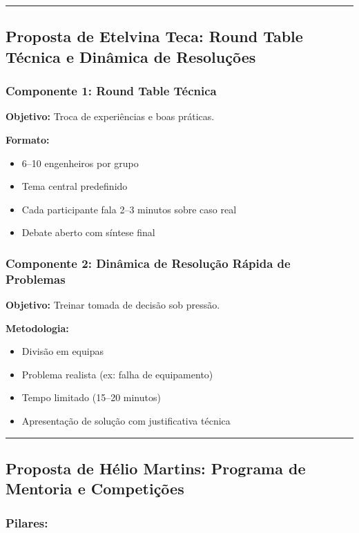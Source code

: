 \documentclass[12pt,a4paper]{article}
\begin{document}
\textcolor{spe-secondary}{\hspace{0.5cm}\rule{0.4\linewidth}{0.8pt}}
\subsection{Proposta de Etelvina Teca: Round Table Técnica e Dinâmica de Resoluções}

\subsubsection*{Componente 1: Round Table Técnica}

\textbf{Objetivo:} Troca de experiências e boas práticas.

\textbf{Formato:}
\begin{itemize}[itemsep=0.15cm]
    \item 6--10 engenheiros por grupo
    \item Tema central predefinido
    \item Cada participante fala 2--3 minutos sobre caso real
    \item Debate aberto com síntese final
\end{itemize}

\subsubsection*{Componente 2: Dinâmica de Resolução Rápida de Problemas}

\textbf{Objetivo:} Treinar tomada de decisão sob pressão.

\textbf{Metodologia:}
\begin{itemize}[itemsep=0.15cm]
    \item Divisão em equipas
    \item Problema realista (ex: falha de equipamento)
    \item Tempo limitado (15--20 minutos)
    \item Apresentação de solução com justificativa técnica
\end{itemize}

\textcolor{spe-secondary}{\hspace{0.5cm}\rule{0.4\linewidth}{0.8pt}}
\subsection{Proposta de Hélio Martins: Programa de Mentoria e Competições}

\subsubsection*{Pilares:}
\end{document}
